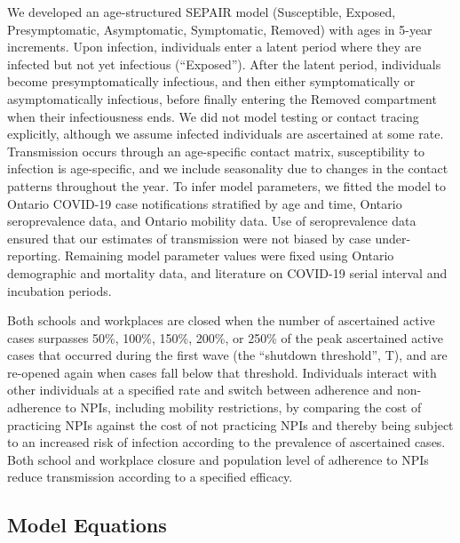 We developed an age-structured SEPAIR model (Susceptible, Exposed, Presymptomatic, Asymptomatic, Symptomatic, Removed) with ages in 5-year increments. Upon infection, individuals enter a latent period where they are infected but not yet infectious (“Exposed”).  After the latent period, individuals become presymptomatically infectious, and then either symptomatically or asymptomatically infectious, before finally entering the Removed compartment when their infectiousness ends. We did not model testing or contact tracing explicitly, although we assume infected individuals are ascertained at some rate. Transmission occurs through an age-specific contact matrix, susceptibility to infection is age-specific, and we include seasonality due to changes in the contact patterns throughout the year.  To infer model parameters, we fitted the model to Ontario COVID-19 case notifications stratified by age and time, Ontario seroprevalence data, and Ontario mobility data.  Use of seroprevalence data ensured that our estimates of transmission were not biased by case under-reporting. Remaining model parameter values were fixed using Ontario demographic and mortality data, and literature on COVID-19 serial interval and incubation periods.

Both schools and workplaces are closed when the number of ascertained active cases surpasses 50\%, 100\%, 150\%, 200\%, or 250\% of the peak ascertained active cases that occurred during the first wave (the “shutdown threshold”, T), and are re-opened again when cases fall below that threshold. Individuals interact with other individuals at a specified rate and switch between adherence and non-adherence to NPIs, including mobility restrictions, by comparing the cost of practicing NPIs against the cost of not practicing NPIs and thereby being subject to an increased risk of infection according to the prevalence of ascertained cases.  Both school and workplace closure and population level of adherence to NPIs reduce transmission according to a specified efficacy. 



\subsection{Model Equations}
 
